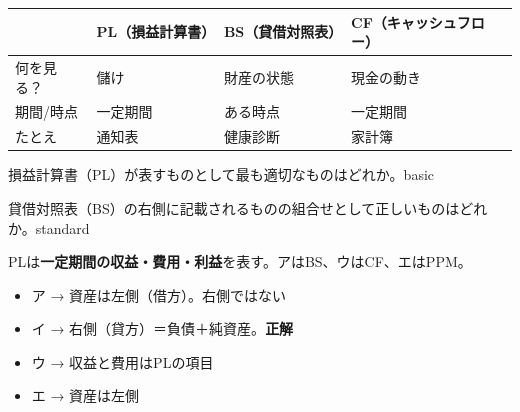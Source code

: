 \mondaipage
{}

\begin{center}
\begin{tabularx}{\textwidth}{lXXX}
  \toprule
  & \textbf{PL（損益計算書）} & \textbf{BS（貸借対照表）} & \textbf{CF（キャッシュフロー）} \\
  \midrule
  何を見る？ & 儲け & 財産の状態 & 現金の動き \\
  期間/時点 & 一定期間 & ある時点 & 一定期間 \\
  たとえ & 通知表 & 健康診断 & 家計簿 \\
  \bottomrule
\end{tabularx}
\end{center}


\begin{mondai}{損益計算書（PL）が表すものとして最も適切なものはどれか。}{basic}
\end{mondai}

\begin{mondai}{貸借対照表（BS）の右側に記載されるものの組合せとして正しいものはどれか。}{standard}
\end{mondai}

\kaitoupage

\begin{kaisetsu}
PLは\textbf{一定期間の収益・費用・利益}を表す。アはBS、ウはCF、エはPPM。
\end{kaisetsu}

\begin{goutoubun}
\begin{itemize}
  \item ア → 資産は左側（借方）。右側ではない
  \item イ → 右側（貸方）＝負債＋純資産。\textbf{正解}
  \item ウ → 収益と費用はPLの項目
  \item エ → 資産は左側
\end{itemize}
\end{goutoubun}



